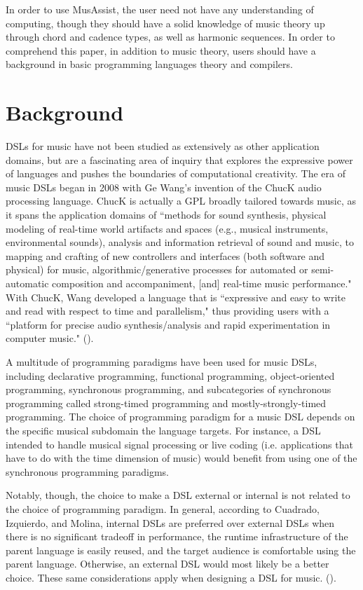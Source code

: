 \documentclass{report}
\newcommand\citeparen[1]{(\cite{#1})}
\begin{document}
In order to use MusAssist, the user need not have any understanding of computing, though they should have a solid knowledge of music theory up through chord and cadence types, as well as harmonic sequences. In order to  comprehend this paper, in addition to music theory, users should have a background in basic programming languages theory and compilers.

\chapter{Background}
\label{chap:background}

DSLs for music have not been studied as extensively as other application domains, but are a fascinating area of inquiry that explores the expressive power of languages and pushes the boundaries of computational creativity. The era of music DSLs began in 2008  with Ge Wang's invention of the ChucK audio processing language. ChucK is actually a GPL broadly tailored towards music, as it spans the application domains of ``methods for sound synthesis, physical modeling of real-time world artifacts and spaces (e.g.,
musical instruments, environmental sounds), analysis and information retrieval of sound and music, to mapping and crafting of new controllers and interfaces (both software and physical) for music, algorithmic/generative processes for automated or semi-automatic composition and accompaniment, [and] real-time music performance." With ChucK, Wang developed a language that is ``expressive and easy to write and read with respect to time and parallelism," thus providing users with a ``platform for precise audio synthesis/analysis and rapid experimentation in computer music." \citeparen{wang_2008}. 

A multitude of programming paradigms have been used for music DSLs, including declarative programming, functional programming, object-oriented programming, synchronous programming, and subcategories of synchronous programming called strong-timed programming and mostly-strongly-timed programming. The choice of programming paradigm for a music DSL depends on the specific musical subdomain the language targets. For instance, a DSL intended to handle musical signal processing or live coding (i.e. applications that have to do with the time dimension of music) would benefit from using one of the synchronous programming paradigms. 

Notably, though, the choice to make a DSL external or internal is not related to the choice of programming paradigm. In general, according to Cuadrado, Izquierdo, and Molina, internal DSLs are preferred over external DSLs when there  is  no significant tradeoff in performance, the runtime infrastructure of the parent language is easily reused, and the target audience is comfortable using  the parent language. Otherwise, an external DSL would most likely be a better choice. These same considerations apply when designing a DSL for music.
\citeparen{cuadrado_izquierdo_molina_2012}.
\end{document}
